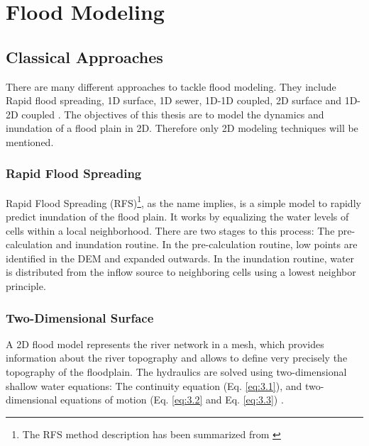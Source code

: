
\chapter{Flood Modeling} %
\label{Chapter3} %
\section{Classical Approaches}

There are many different approaches to tackle flood modeling. They include Rapid flood spreading, 1D surface, 1D sewer, 1D-1D coupled, 2D surface and 1D-2D coupled \cite{bulti2020review}. The objectives of this thesis are to model the dynamics and inundation of a flood plain in 2D. Therefore only 2D modeling techniques will be mentioned.

\subsection*{Rapid Flood Spreading} 

Rapid Flood Spreading (RFS)\footnote{The RFS method description has been summarized from \citeauthor{liu2010new} \cite{liu2010new}}, as the name implies, is a simple model to rapidly predict inundation of the flood plain. It works by equalizing the water levels of cells within a local neighborhood. There are two stages to this process: The pre-calculation and inundation routine. In the pre-calculation routine, low points are identified in the DEM and expanded outwards. In the inundation routine, water is distributed from the inflow source to neighboring cells using a lowest neighbor principle.

	
\subsection*{Two-Dimensional Surface}
A 2D flood model represents the river network in a mesh, which provides information about the river topography and allows to define very precisely the topography of the floodplain. The hydraulics are solved using two-dimensional shallow  water equations: The continuity equation (Eq. \ref{eq:3.1}), and two-dimensional equations of motion \cite{o1993two} (Eq. \ref{eq:3.2} and Eq. \ref{eq:3.3}) .

